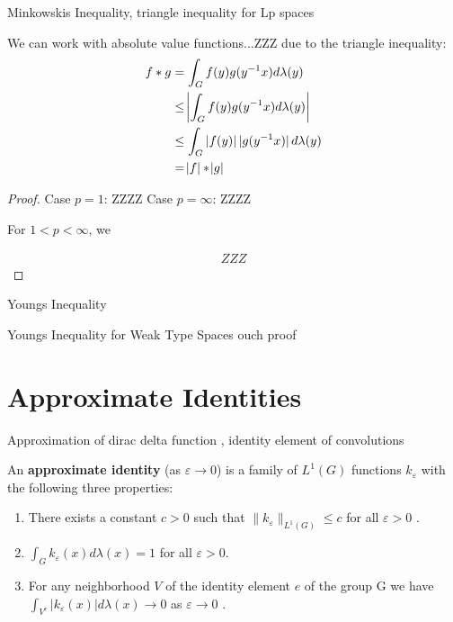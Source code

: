 \begin{theorem}
Minkowskis Inequality, triangle inequality for Lp spaces
\end{theorem}

\begin{remark}
We can work with absolute value functions...ZZZ due to the triangle inequality:
\begin{align*}
f \ast g &= \int_G f(y)g(y^{-1}x) d\lambda(y) \\
&\leq \abs{ \int_G f(y)g(y^{-1}x) d\lambda(y) } \\
&\leq \int_G \abs[0]{f(y)}\abs[0]{g(y^{-1}x)} d\lambda(y) \\
&= \abs{f} \ast \abs{g}
\end{align*}
\end{remark}

\begin{proof}

Case $p=1$:
ZZZZ
Case $p=\infty$:
ZZZZ

For $ 1 < p < \infty$, we 

\begin{align*}
ZZZ
\end{align*}

\end{proof}

\begin{theorem}
Youngs Inequality
\end{theorem}


\begin{theorem}
Youngs Inequality for Weak Type Spaces
ouch proof
\end{theorem}

\section{Approximate Identities}

Approximation of dirac delta function , identity element of convolutions

\begin{definition}
An \textbf{approximate identity} (as $\varepsilon \rightarrow 0$) is a family of $L^1(G)$ functions $k_\varepsilon$ with the following three properties: 
\begin{enumerate}[label=(\roman*)]
\item There exists a constant $c > 0$ such that $\| k_\varepsilon \| _ {L^1(G)} \leqslant c$ for all $ \varepsilon > 0 $ . 
\item $ \int_G k_\varepsilon(x) d\lambda(x) = 1$ for all $\varepsilon > 0 $.
\item For any neighborhood $V$ of the identity element $e$ of the group G we have $ \int_{V^c} | k_\varepsilon(x) | d \lambda(x) \rightarrow 0  $ as $ \varepsilon \rightarrow 0 $ . 
\end{enumerate}
\end{definition}

